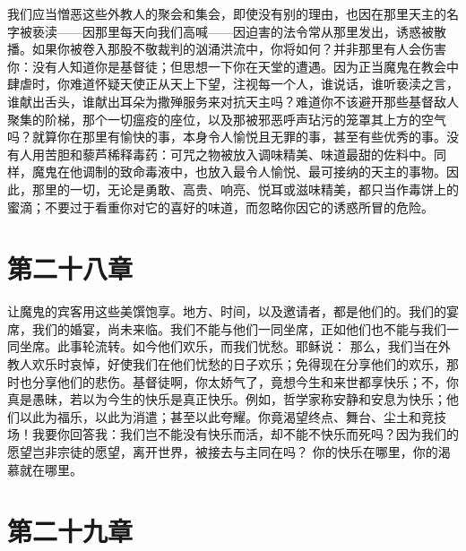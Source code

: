我们应当憎恶这些外教人的聚会和集会，即使没有别的理由，也因在那里天主的名字被亵渎——因那里每天向我们高喊——因迫害的法令常从那里发出，诱惑被散播。如果你被卷入那股不敬裁判的汹涌洪流中，你将如何？并非那里有人会伤害你：没有人知道你是基督徒；但思想一下你在天堂的遭遇。因为正当魔鬼在教会中肆虐时，你难道怀疑天使正从天上下望，注视每一个人，谁说话，谁听亵渎之言，谁献出舌头，谁献出耳朵为撒殚服务来对抗天主吗？难道你不该避开那些基督敌人聚集的阶梯，那个一切瘟疫的座位，以及那被邪恶呼声玷污的笼罩其上方的空气吗？就算你在那里有愉快的事，本身令人愉悦且无罪的事，甚至有些优秀的事。没有人用苦胆和藜芦稀释毒药：可咒之物被放入调味精美、味道最甜的佐料中。同样，魔鬼在他调制的致命毒液中，也放入最令人愉悦、最可接纳的天主的事物。因此，那里的一切，无论是勇敢、高贵、响亮、悦耳或滋味精美，都只当作毒饼上的蜜滴；不要过于看重你对它的喜好的味道，而忽略你因它的诱惑所冒的危险。\par


\section{第二十八章}

让魔鬼的宾客用这些美馔饱享。地方、时间，以及邀请者，都是他们的。我们的宴席，我们的婚宴，尚未来临。我们不能与他们一同坐席，正如他们也不能与我们一同坐席。此事轮流转。如今他们欢乐，而我们忧愁。耶稣说： 那么，我们当在外教人欢乐时哀悼，好使我们在他们忧愁的日子欢乐；免得现在分享他们的欢乐，那时也分享他们的悲伤。基督徒啊，你太娇气了，竟想今生和来世都享快乐；不，你真是愚昧，若以为今生的快乐是真正快乐。例如，哲学家称安静和安息为快乐；他们以此为福乐，以此为消遣；甚至以此夸耀。你竟渴望终点、舞台、尘土和竞技场！我要你回答我：我们岂不能没有快乐而活，却不能不快乐而死吗？因为我们的愿望岂非宗徒的愿望，离开世界，被接去与主同在吗？ 你的快乐在哪里，你的渴慕就在哪里。\par


\section{第二十九章}

